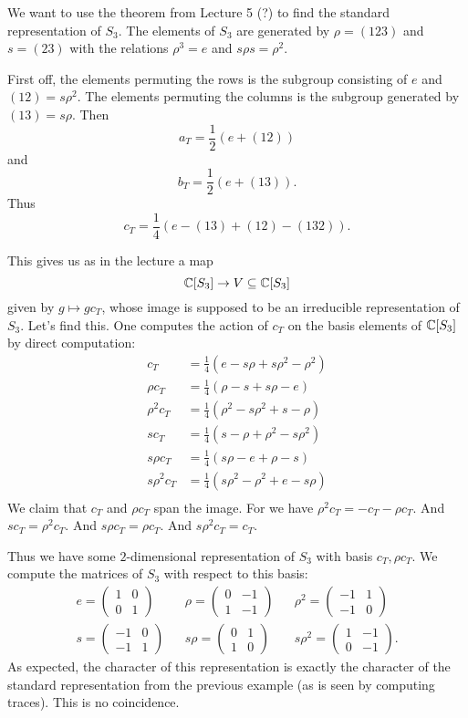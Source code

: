 \documentclass[11pt, english]{article}
\begin{document}
We want to use the theorem from Lecture 5 (?) to find the standard representation of $S_3$. The elements of $S_3$ are generated by $\rho=(123)$ and $s=(23)$ with the relations $\rho^3=e$ and $s\rho s =\rho^2$. 

First off, the elements permuting the rows is the subgroup consisting of $e$ and $(12)=s\rho^2$. The elements permuting the columns is the subgroup generated by $(13)=s\rho$. Then
$$
a_T = \frac 12 \left(e+(12)\right)
$$
and
$$
b_T = \frac 12 \left( e+(13) \right).
$$
Thus
$$
c_T= \frac 14 \left( e -(13) + (12)-(132) \right).
$$

This gives us as in the lecture a map
$$
\mathbb{C}[S_3] \to V \subseteq \mathbb{C}[S_3]
$$
given by $g \mapsto g c_T$, whose image is supposed to be an irreducible representation of $S_3$. Let's find this. One computes the action of $c_T$ on the basis elements of $\mathbb{C}[S_3]$ by direct computation:
\begin{align*}
  c_T      &= \frac 14 \left( e -s\rho  + s\rho^2-\rho^2 \right) \\
 \rho c_T  &= \frac 14 \left( \rho - s + s\rho -e \right) \\
 \rho^2 c_T &= \frac 14 \left( \rho^2 - s\rho^2 + s -\rho \right) \\
sc_T &= \frac 14 \left( s-\rho + \rho^2-s\rho^2 \right)  \\
s \rho c_T &= \frac 14 \left( s \rho -e+\rho-s \right) \\
s \rho^2 c_T &= \frac 14 \left( s\rho^2-\rho^2+e - s\rho \right) \\
\end{align*}
We claim that $c_T$ and $\rho c_T$ span the image. For we have $\rho^2 c_T = -c_T-\rho c_T$. And $sc_T=\rho^2 c_T$. And $s \rho c_T = \rho c_T$. And $s \rho^2 c_T = c_T$. 

Thus we have some $2$-dimensional representation of $S_3$ with basis $c_T, \rho c_T$. We compute the matrices of $S_3$ with respect to this basis:
\begin{align*}
e =
\begin{pmatrix}
1 & 0 \\ 0 & 1
\end{pmatrix}
&&
\rho = 
\begin{pmatrix}
0 & -1 \\ 1 & -1
\end{pmatrix}
&&
\rho^2 =
\begin{pmatrix}
-1 & 1 \\ -1 & 0
\end{pmatrix} \\
s =
\begin{pmatrix}
-1 & 0 \\ -1 & 1
\end{pmatrix}
&&
s\rho  =
\begin{pmatrix}
0 & 1 \\ 1 & 0
\end{pmatrix}
&&
s\rho^2  =
\begin{pmatrix}
1 & -1 \\ 0 & -1
\end{pmatrix}.
\end{align*}
As expected, the character of this representation is exactly the character of the standard representation from the previous example (as is seen by computing traces). This is no coincidence.
\end{document}
